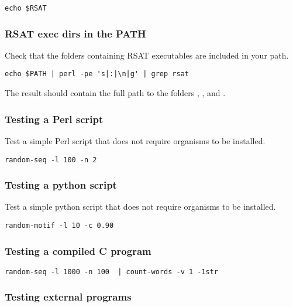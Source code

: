 \documentclass[12pt,a4paper, oneside]{scrreprt} %
\begin{document}
\begin{lstlisting}
echo $RSAT
\end{lstlisting}

\subsubsection{RSAT exec dirs in the PATH}

Check that the folders containing RSAT executables are included in
your path.

\begin{lstlisting}
echo $PATH | perl -pe 's|:|\n|g' | grep rsat
\end{lstlisting}

The result should contain the full path to the folders ,
, and .

\subsubsection{Testing a \RSAT Perl script}

Test a simple Perl script that does not require organisms to be
installed.

\begin{lstlisting}
random-seq -l 100 -n 2
\end{lstlisting}

\subsubsection{Testing a \RSAT python script}

Test a simple python script that does not require organisms to be
installed.

\begin{lstlisting}
random-motif -l 10 -c 0.90
\end{lstlisting}

\subsubsection{Testing a compiled C program}

\begin{lstlisting}
random-seq -l 1000 -n 100  | count-words -v 1 -1str
\end{lstlisting}

\subsubsection{Testing external programs}
\end{document}
